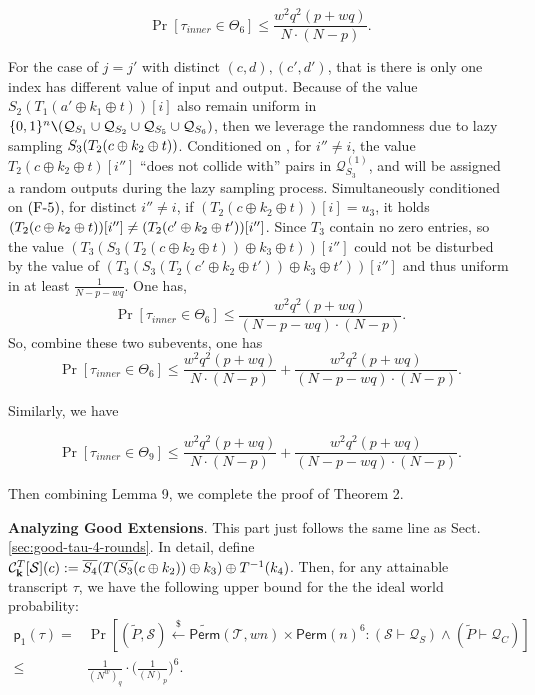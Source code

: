 $$
\operatorname{Pr}\left[\tau_{inner} \in \Theta_{6}\right] \leq \frac{w^{2} q^{2} (p+w q)}{N \cdot (N-p)}.
$$

For the case of $j=j'$ with distinct $(c,d),(c',d')$, that is there is only one index has different value of input and output. Because of the value $S_{2}\left(T_1\left(a' \oplus k_{1} \oplus t\right)\right)[i]$ also remain uniform in $\{0, 1\}^{n} \verb|\| (\mathcal{Q}_{S_{1}} \cup \mathcal{Q}_{S_{2}} \cup \mathcal{Q}_{S_{5}} \cup \mathcal{Q}_{S_{6}})$, then we leverage the randomness due to lazy sampling $S_3(T_2(c\oplus k_2\oplus t))$. Conditioned on \feaiv, for $i''\neq i$, the value $T_2(c \oplus k_2 \oplus t)[i'']$ ``does not collide with'' pairs in $\mathcal{Q}_{S_{3}}^{(1)}$, and will be assigned a random outputs during the lazy sampling process. Simultaneously conditioned on $\text{(F-5)}$, for distinct $i'' \neq i$, if $(T_2\left(c \oplus k_{2} \oplus t\right))[i] = u_3$, it holds $(T_2(c\oplus k_2 \oplus t))[i'']\neq (T_2(c'\oplus k_2 \oplus t'))[i'']$. Since $T_3$ contain no zero entries, so the value $ \left(T_{3}\left(S_{3}\left(T_2\left(c \oplus k_{2} \oplus t\right)\right) \oplus k_{3} \oplus t\right)\right)[i'']$ could not be disturbed by the value of $ \left(T_{3}\left(S_{3}\left(T_2\left(c' \oplus k_{2} \oplus t'\right)\right) \oplus k_{3} \oplus t'\right)\right)[i'']$ and thus uniform in at least $\frac{1}{N - p- wq}$. One has,
$$
\operatorname{Pr}\left[\tau_{inner} \in \Theta_{6}\right] \leq \frac{w^{2} q^{2} (p+w q)}{(N- p- wq) \cdot (N-p)}.
$$
\noindent So, combine these two subevents, one has
$$
\operatorname{Pr}\left[\tau_{inner} \in \Theta_{6}\right] \leq \frac{w^{2} q^{2} (p+w q)}{N \cdot (N-p)} + \frac{w^{2} q^{2} (p+w q)}{(N- p- wq) \cdot (N- p)}.
$$

\noindent Similarly, we have

$$
\operatorname{Pr}\left[\tau_{inner} \in \Theta_{9}\right] \leq \frac{w^{2} q^{2} (p+w q)}{N \cdot (N-p)} + \frac{w^{2} q^{2} (p+w q)}{(N- p- wq) \cdot (N- p)}.
$$

\noindent Then combining Lemma 9, we complete the proof of Theorem 2.






\arrangespace

\noindent \textbf{Analyzing Good Extensions}.
%
This part just follows the same line as Sect. \ref{sec:good-tau-4-rounds}. In detail, define $\mathcal{C}_{\mathbf{k}}^T[\mathcal{S}](c):=   \overline{S_4}(T(\overline{S_3}(c\oplus k_2))\oplus k_3)\oplus T^{-1}(k_4)$. Then, for any attainable transcript $\tau$, we have the following upper bound for the the ideal world probability:
%
%
\begin{align*}
\mathsf{p}_{1}(\tau)=&\operatorname{Pr}\left[(\widetilde{P},\mathcal{S})\stackrel{\$}{\leftarrow} \widetilde{{\mathsf{Perm}}}(\mathcal{T}, w n)\times\mathsf{Perm}(n)^6: (\mathcal{S} \vdash \mathcal{Q}_{S}) \wedge(\widetilde{P} \vdash \mathcal{Q}_{C})  \right]		\\
\leq&\frac{1}{(N^w)_q}\cdot\bigg(\frac{1}{(N)_p}\bigg)^6.
\end{align*}



